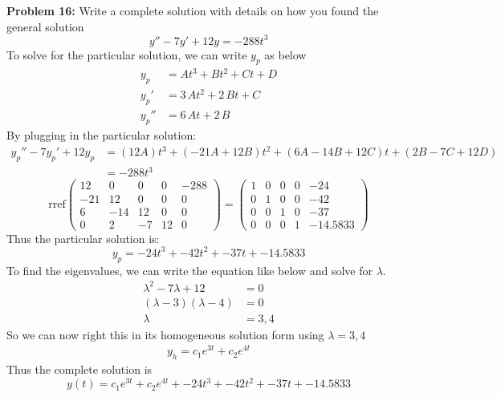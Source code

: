 \documentclass[12pt]{article}
\begin{document}
\newpage 

\noindent \textbf{Problem 16: }Write a complete solution with details on how you found the general solution
	$$
	y'' - 7y' + 12y = -288t^3
	$$
To solve for the particular solution, we can write $y_p$ as below
	\begin{align*}
		y_p &= A{t}^{3}+B{t}^{2}+Ct+D \\
		y_p' &= 3\,A{t}^{2}+2\,Bt+C \\
		y_p'' &= 6\,At+2\,B
	\end{align*}
By plugging in the particular solution:
	\begin{align*}
	y_p'' -7y_p' + 12y_p &= (12A)t^3 + (-21A + 12B)t^2 + (6A -14B + 12C)t + (2B - 7C + 12D) \\
	&= -288t^3
	\end{align*}
	$$
	\text{rref}
	\begin{pmatrix}
		12 & 0 & 0 & 0 & -288 \\
		-21 & 12 & 0 & 0 & 0 \\
		6 & -14 & 12 & 0 & 0 \\
		0 & 2 & -7 & 12 & 0
	\end{pmatrix}
	= 
	\begin{pmatrix}
		1 & 0 & 0 & 0 & -24 \\
		0 & 1 & 0 & 0 & -42 \\
		0 & 0 & 1 & 0 & -37 \\
		0 & 0 & 0 & 1 & -14.5833
	\end{pmatrix}
	$$
Thus the particular solution is: 
	$$
	y_p = -24{t}^{3}+-42{t}^{2}+-37t+-14.5833
	$$
To find the eigenvalues, we can write the equation like below and solve for $\lambda$.
	\begin{align*}
		\lambda^2 - 7\lambda + 12 &= 0 \\
		(\lambda - 3)(\lambda  - 4) &= 0 \\
		\lambda &= 3, 4
	\end{align*}
So we can now right this in its homogeneous solution form using $\lambda = 3, 4$
	\begin{align*}
		y_h = c_1e^{3t} + c_2e^{4t}
	\end{align*}
Thus the complete solution is 
	$$
	y(t) = c_1e^{3t} + c_2e^{4t} + -24{t}^{3}+-42{t}^{2}+-37t+-14.5833
	$$

\newpage 
\end{document}
